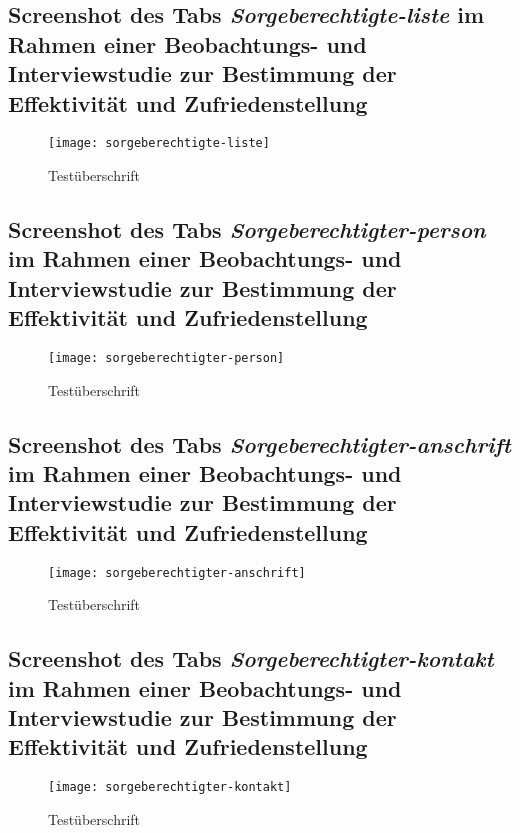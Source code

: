 \begin{landscape}
    \subsection{Screenshot des Tabs \textit{Sorgeberechtigte-liste} im Rahmen einer Beobachtungs- und Interviewstudie zur Bestimmung der Effektivität und Zufriedenstellung}
    \label{section-sorgeberechtigte-liste}
    \begin{figure}[H]
        \centering
        \caption{Testüberschrift}
        \begin{adjustbox}{width=\linewidth, center}
            \texttt{[image: sorgeberechtigte-liste]}
        \end{adjustbox}
    \end{figure}

    \subsection{Screenshot des Tabs \textit{Sorgeberechtigter-person} im Rahmen einer Beobachtungs- und Interviewstudie zur Bestimmung der Effektivität und Zufriedenstellung}
    \label{section-sorgeberechtigter-person}
    \begin{figure}[H]
        \centering
        \caption{Testüberschrift}
        \begin{adjustbox}{width=0.5\linewidth, center}
            \texttt{[image: sorgeberechtigter-person]}
        \end{adjustbox}
    \end{figure}

    \subsection{Screenshot des Tabs \textit{Sorgeberechtigter-anschrift} im Rahmen einer Beobachtungs- und Interviewstudie zur Bestimmung der Effektivität und Zufriedenstellung}
    \label{section-sorgeberechtigter-anschrift}
    \begin{figure}[H]
        \centering
        \caption{Testüberschrift}
        \begin{adjustbox}{width=0.85\linewidth, center}
            \texttt{[image: sorgeberechtigter-anschrift]}
        \end{adjustbox}
    \end{figure}

    \subsection{Screenshot des Tabs \textit{Sorgeberechtigter-kontakt} im Rahmen einer Beobachtungs- und Interviewstudie zur Bestimmung der Effektivität und Zufriedenstellung}
    \label{section-sorgeberechtigter-kontakt}
    \begin{figure}[H]
        \centering
        \caption{Testüberschrift}
        \begin{adjustbox}{width=0.6\linewidth, center}
            \texttt{[image: sorgeberechtigter-kontakt]}
        \end{adjustbox}
    \end{figure}


\end{landscape}
